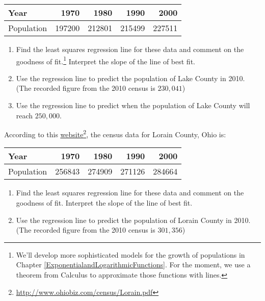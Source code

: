\begin{exenum}
\medskip
\begin{tabular}{|l|r|r|r|r|} \hline
Year & 1970 & 1980 & 1990 & 2000 \\
\hline
Population & 197200 & 212801 & 215499 & 227511 \\ \hline
\end{tabular}
\medskip

\begin{enumerate}

\item  Find the least squares regression line for these data and comment on the goodness of fit.\footnote{We'll develop more sophisticated models for the growth of populations in Chapter \ref{ExponentialandLogarithmicFunctions}.  For the moment, we use a theorem from Calculus to approximate those functions with lines.} Interpret the slope of the line of best fit.

\item  Use the regression line to predict the population of Lake County in 2010.  (The recorded figure from the 2010 census is $230,\!041$)

\item  Use the regression line to predict when the population of Lake County will reach $250,\!000$.

\end{enumerate}

\item According to this \href{http://www.ohiobiz.com/census/Lorain.pdf}{\underline{website}}\footnote{\href{http://www.ohiobiz.com/census/Lorain.pdf}{\underline{http://www.ohiobiz.com/census/Lorain.pdf}}}, the census data for Lorain County, Ohio is:

\medskip
\begin{tabular}{|l|r|r|r|r|} \hline
Year & 1970 & 1980 & 1990 & 2000 \\
\hline
Population & 256843 & 274909 & 271126 & 284664 \\ \hline
\end{tabular}
\medskip

\begin{enumerate}

\item  Find the least squares regression line for these data and comment on the goodness of fit. Interpret the slope of the line of best fit.

\item  Use the regression line to predict the population of Lorain County in 2010.  (The recorded figure from the 2010 census is $301,\!356$)


\end{enumerate}
\end{exenum}
